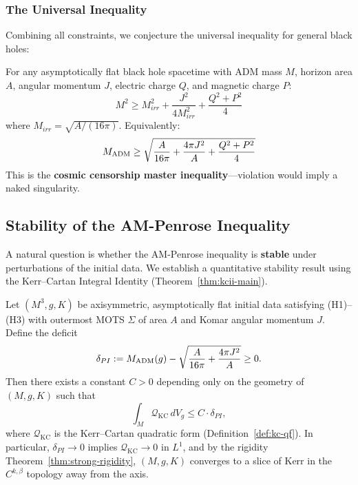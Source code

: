 \subsubsection{The Universal Inequality}

Combining all constraints, we conjecture the universal inequality for general black holes:

\begin{conjecture}\label{conj:universal}
For any asymptotically flat black hole spacetime with ADM mass $M$, horizon area $A$, angular momentum $J$, electric charge $Q$, and magnetic charge $P$:
\begin{equation}
M^2 \geq M_{irr}^2 + \frac{J^2}{4M_{irr}^2} + \frac{Q^2 + P^2}{4}
\end{equation}
where $M_{irr} = \sqrt{A/(16\pi)}$. Equivalently:
\begin{equation}
M_{\mathrm{ADM}} \geq \sqrt{\frac{A}{16\pi} + \frac{4\pi J^2}{A} + \frac{Q^2 + P^2}{4}}
\end{equation}
This is the \textbf{cosmic censorship master inequality}---violation would imply a naked singularity.
\end{conjecture}

\subsection{Stability of the AM-Penrose Inequality}\label{subsec:stability}

A natural question is whether the AM-Penrose inequality is \textbf{stable} under perturbations of the initial data. We establish a quantitative stability result using the Kerr--Cartan Integral Identity (Theorem~\ref{thm:kcii-main}).

\begin{theorem}\label{thm:stability}
Let $(M^3, g, K)$ be axisymmetric, asymptotically flat initial data satisfying (H1)--(H3) with outermost MOTS $\Sigma$ of area $A$ and Komar angular momentum $J$. Define the deficit
\begin{equation}
\delta_{PI} := M_{\mathrm{ADM}}(g) - \sqrt{\frac{A}{16\pi} + \frac{4\pi J^2}{A}} \geq 0.
\end{equation}
Then there exists a constant $C > 0$ depending only on the geometry of $(M, g, K)$ such that
\begin{equation}\label{eq:stability-bound}
\int_M \mathcal{Q}_{\mathrm{KC}} \, dV_g \leq C \cdot \delta_{PI},
\end{equation}
where $\mathcal{Q}_{\mathrm{KC}}$ is the Kerr--Cartan quadratic form (Definition~\ref{def:kc-qf}). In particular, $\delta_{PI} \to 0$ implies $\mathcal{Q}_{\mathrm{KC}} \to 0$ in $L^1$, and by the rigidity Theorem~\ref{thm:strong-rigidity}, $(M, g, K)$ converges to a slice of Kerr in the $C^{k,\beta}$ topology away from the axis.
\end{theorem}

